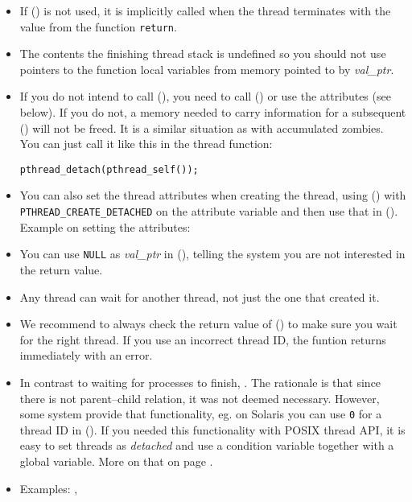 \begin{itemize}
\item If () is not used, it is implicitly called when the
thread terminates with the value from the function \texttt{return}.
\item The contents the finishing thread stack is undefined so you should not use
pointers to the function local variables from memory pointed to by
\emph{val\_ptr}.
\item If you do not intend to call (), you need to call
() or use the attributes (see below).  If you do not, a
memory needed to carry information for a subsequent () will
not be freed.  It is a similar situation as with accumulated zombies.  You can
just call it like this in the thread function:
\begin{alltt}
pthread\_detach(pthread\_self());
\end{alltt}
\item You can also set the thread attributes when creating the thread, using
() with
\texttt{PTHREAD\_CREATE\_DETACHED} on the attribute variable and then use that
in ().  Example on setting the attributes:
\item You can use \texttt{NULL} as \emph{val\_ptr} in (),
telling the system you are not interested in the return value.
\item Any thread can wait for another thread, not just the one that created it.
\item We recommend to always check the return value of ()
to make sure you wait for the right thread.  If you use an incorrect thread ID,
the funtion returns immediately with an error.
\item In contrast to waiting for processes to finish, .  The rationale is that since there is not parent--child
relation, it was not deemed necessary.  However, some system provide that
functionality, eg.  on Solaris you can use \texttt{0} for a thread ID in
().  If you needed this functionality with POSIX thread API, it
is easy to set threads as \emph{detached} and use a condition variable together
with a global variable.  More on that on page \pageref{CONDITION_VARIABLES}.
\item \label{PTHREAD_JOIN} Examples: ,
\end{itemize}


